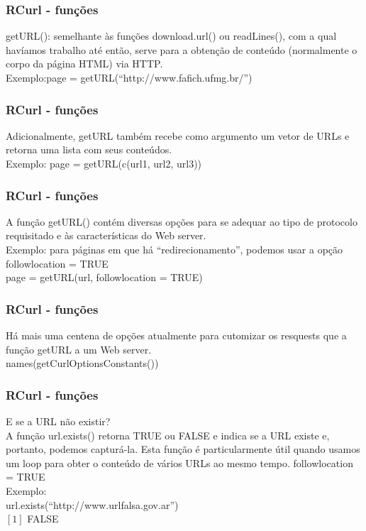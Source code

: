 \documentclass[11pt]{beamer}
\begin{document}
\begin{frame}
	\frametitle{RCurl - funções}
	getURL(): semelhante às funções download.url() ou readLines(), com a 		qual havíamos trabalho até então, serve para a obtenção de conteúdo 	
	(normalmente o corpo da página HTML) via HTTP.
	\newline\\
	Exemplo:page = getURL(``http://www.fafich.ufmg.br/'')
\end{frame}

\begin{frame}
	\frametitle{RCurl - funções}
	Adicionalmente, getURL também recebe como argumento um vetor de URLs e 		retorna uma lista com seus conteúdos.
	\newline\\
	Exemplo: page = getURL(c(url1, url2, url3))
\end{frame}

\begin{frame}
	\frametitle{RCurl - funções}
	A função getURL() contém diversas opções para se adequar ao tipo de
	protocolo requisitado e às características do Web server.
	\newline\\
	Exemplo: para páginas em que há ``redirecionamento'', podemos usar a opção
	followlocation = TRUE
	\newline\\
	page = getURL(url, followlocation = TRUE)
\end{frame}

\begin{frame}
	\frametitle{RCurl - funções}
	Há mais uma centena de opções atualmente para cutomizar os resquests  que
	a função getURL a um Web server.
	\newline\\
	names(getCurlOptionsConstants())
\end{frame}

\begin{frame}
	\frametitle{RCurl - funções}
	E se a URL não existir?
	\newline\\
	A função url.exists() retorna TRUE ou FALSE e indica se a URL existe e, 	portanto, podemos capturá-la. Esta função é particularmente útil quando 	usamos um loop para obter o conteúdo de vários URLs ao mesmo tempo.
	followlocation = TRUE
	\newline\\
	Exemplo:\\
	url.exists(``http://www.urlfalsa.gov.ar'')\\
	$[1]$ FALSE
\end{frame}
\end{document}
